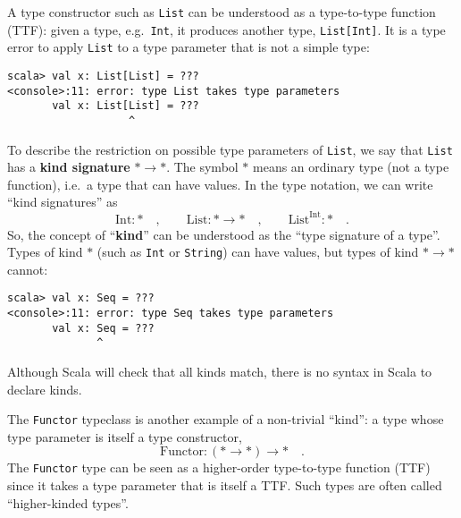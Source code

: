 A type constructor such as \lstinline!List! can be understood as
a type-to-type function (TTF): given a type, e.g.~\lstinline!Int!,
it produces another type, \lstinline!List[Int]!. It is a type error
to apply \lstinline!List! to a type parameter that is not a simple
type:
\begin{lstlisting}
scala> val x: List[List] = ???
<console>:11: error: type List takes type parameters
       val x: List[List] = ???
                   ^
\end{lstlisting}
To describe the restriction on possible type parameters of \lstinline!List!,
we say that \lstinline!List! has a \textbf{kind signature}
$*\rightarrow*$. The symbol $*$ means an ordinary type (not a type
function), i.e.~a type that can have values. In the type notation,
we can write ``kind signatures'' as
\[
\text{Int}:*\quad,\quad\quad\text{List}:*\rightarrow*\quad,\quad\quad\text{List}^{\text{Int}}:*\quad.
\]
So, the concept of ``\textbf{kind}'' can be understood as the ``type
signature of a type''. Types of kind $*$ (such as \lstinline!Int!
or \lstinline!String!) can have values, but types of kind $*\rightarrow*$
cannot:
\begin{lstlisting}
scala> val x: Seq = ???
<console>:11: error: type Seq takes type parameters
       val x: Seq = ???
              ^
\end{lstlisting}
Although Scala will check that all kinds match, there is no syntax
in Scala to declare kinds.

The \lstinline!Functor! typeclass is another example of a non-trivial
``kind'': a type whose type parameter is itself a type constructor,
\[
\text{Functor}:(*\rightarrow*)\rightarrow*\quad.
\]
The \lstinline!Functor! type can be seen as a higher-order type-to-type
function (TTF) since it takes a type parameter that is itself a TTF.
Such types are often called ``higher-kinded types''.

